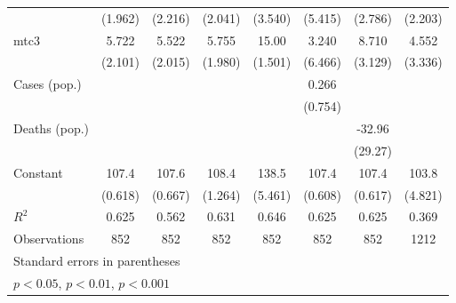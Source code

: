 \documentclass{article}
\begin{document}
{\begin{longtable}{l*{7}{c}}
                &  (1.962)         &  (2.216)         &  (2.041)         &  (3.540)         &  (5.415)         &  (2.786)         &  (2.203)         \\
mtc3            &    5.722\sym{*}  &    5.522\sym{*}  &    5.755\sym{*}  &    15.00\sym{***}&    3.240         &    8.710\sym{*}  &    4.552         \\
                &  (2.101)         &  (2.015)         &  (1.980)         &  (1.501)         &  (6.466)         &  (3.129)         &  (3.336)         \\
Cases (pop.)    &                  &                  &                  &                  &    0.266         &                  &                  \\
                &                  &                  &                  &                  &  (0.754)         &                  &                  \\
Deaths (pop.)   &                  &                  &                  &                  &                  &   -32.96         &                  \\
                &                  &                  &                  &                  &                  &  (29.27)         &                  \\
Constant        &    107.4\sym{***}&    107.6\sym{***}&    108.4\sym{***}&    138.5\sym{***}&    107.4\sym{***}&    107.4\sym{***}&    103.8\sym{***}\\
                &  (0.618)         &  (0.667)         &  (1.264)         &  (5.461)         &  (0.608)         &  (0.617)         &  (4.821)         \\
\hline
\(R^{2}\)       &    0.625         &    0.562         &    0.631         &    0.646         &    0.625         &    0.625         &    0.369         \\
Observations    &      852         &      852         &      852         &      852         &      852         &      852         &     1212         \\
\hline\hline
\multicolumn{8}{l}{\footnotesize Standard errors in parentheses}\\
\multicolumn{8}{l}{\footnotesize \sym{*} \(p<0.05\), \sym{**} \(p<0.01\), \sym{***} \(p<0.001\)}\\
\end{longtable}
}
\end{document}
